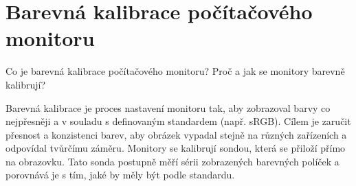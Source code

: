 \section{Barevná kalibrace počítačového monitoru}
Co je barevná kalibrace počítačového monitoru? Proč a jak se monitory barevně kalibrují?

Barevná kalibrace je proces nastavení monitoru tak, aby zobrazoval barvy co nejpřesněji a v souladu s definovaným 
standardem (např. sRGB).
Cílem je zaručit přesnost a konzistenci barev, aby obrázek vypadal stejně na různých zařízeních a odpovídal tvůrčímu 
záměru. Monitory se kalibrují sondou, která se přiloží přímo na obrazovku. Tato sonda postupně měří sérii zobrazených 
barevných políček a porovnává je s tím, jaké by měly být podle standardu.